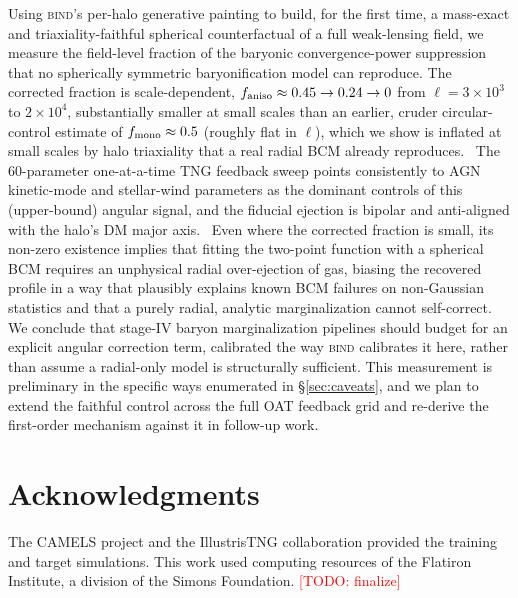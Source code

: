 \documentclass[11pt]{article}
\newcommand{\bind}{\textsc{bind}}
\newcommand{\todo}[1]{\textcolor{red}{[TODO: #1]}}
\newcommand{\faniso}{f_{\rm aniso}}
\newcommand{\fmono}{f_{\rm mono}}
\begin{document}
Using \bind{}'s per-halo generative painting to build, for the first
time, a mass-exact and triaxiality-faithful spherical counterfactual of a
full weak-lensing field, we measure the field-level fraction of the
baryonic convergence-power suppression that no spherically symmetric
baryonification model can reproduce. The corrected fraction is
scale-dependent, $\faniso\approx0.45\to0.24\to0$ from
$\ell=3\times10^3$ to $2\times10^4$, substantially smaller at small
scales than an earlier, cruder circular-control estimate of
$\fmono\approx0.5$ (roughly flat in $\ell$), which we show is inflated at
small scales by halo triaxiality that a real radial BCM already
reproduces.\ %
The 60-parameter one-at-a-time TNG feedback sweep points consistently to
AGN kinetic-mode and stellar-wind parameters as the dominant controls of
this (upper-bound) angular signal, and the fiducial ejection is
bipolar and anti-aligned with the halo's DM major axis.\ %
Even where the corrected fraction is small, its non-zero existence
implies that fitting the two-point function with a spherical BCM requires
an unphysical radial over-ejection of gas, biasing the recovered profile
in a way that plausibly explains known BCM failures on non-Gaussian
statistics and that a purely radial, analytic marginalization cannot
self-correct. We conclude that stage-IV baryon marginalization pipelines
should budget for an explicit angular correction term, calibrated the way
\bind{} calibrates it here, rather than assume a radial-only model is
structurally sufficient. This measurement is preliminary in the specific
ways enumerated in \S\ref{sec:caveats}, and we plan to extend the
faithful control across the full OAT feedback grid and re-derive the
first-order mechanism against it in follow-up work.

\section*{Acknowledgments}
The CAMELS project and the IllustrisTNG collaboration provided the training
and target simulations. This work used computing resources of the Flatiron
Institute, a division of the Simons Foundation. \todo{finalize}



\end{document}
